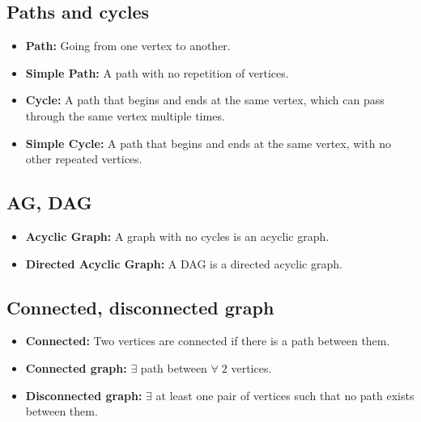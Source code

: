 \documentclass{article}
\begin{document}
\subsection{Paths and cycles}
    \begin{terminology}
        \begin{itemize}
            \item \textbf{Path:} Going from one vertex to another. 
            
            \item \textbf{Simple Path:} A path with no repetition of vertices.
            
            \item \textbf{Cycle:} A path that begins and ends at the same vertex, which can pass through the same vertex multiple times.

            \item \textbf{Simple Cycle:} A path that begins and ends at the same vertex, with no other repeated vertices.
        \end{itemize}
    \end{terminology}
    
\subsection{AG, DAG}
    \begin{terminology}
        \begin{itemize}
            \item \textbf{Acyclic Graph:} A graph with no cycles is an acyclic graph.
            \item \textbf{Directed Acyclic Graph:} A DAG is a directed acyclic graph. 
        \end{itemize}
    \end{terminology}

\subsection{Connected, disconnected graph}
    \begin{terminology}
        \begin{itemize}
            \item \textbf{Connected:} Two vertices are connected if there is a path between them.
            \item \textbf{Connected graph:} $\exists$ path between $\forall \; 2$ vertices.
            \item \textbf{Disconnected graph:} $\exists$ at least one pair of vertices such that no path exists between them.
        \end{itemize}
    \end{terminology}
\end{document}
